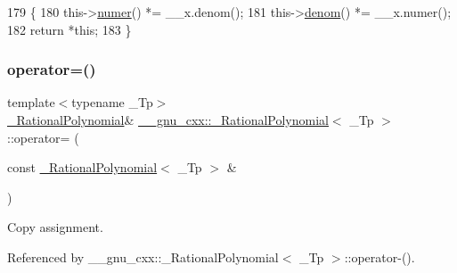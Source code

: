 \begin{DoxyCode}
179       \{
180         this->\hyperlink{class____gnu__cxx_1_1__RationalPolynomial_aa42ac2f6c2368cae05ba3a3cebf0fa24}{numer}() *= \_\_x.denom();
181         this->\hyperlink{class____gnu__cxx_1_1__RationalPolynomial_a05e84913ccfddcf6fcbfe623cb56c937}{denom}() *= \_\_x.numer();
182         \textcolor{keywordflow}{return} *\textcolor{keyword}{this};
183       \}
\end{DoxyCode}
\mbox{\label{class____gnu__cxx_1_1__RationalPolynomial_afa1efd00dfffcf6851bac3da7ba399dc}} 
\subsubsection{\texorpdfstring{operator=()}{operator=()}\hspace{0.1cm}{\footnotesize\ttfamily [1/2]}}
{\footnotesize\ttfamily template$<$typename \+\_\+\+Tp$>$ \\
\hyperlink{class____gnu__cxx_1_1__RationalPolynomial}{\+\_\+\+Rational\+Polynomial}\& \hyperlink{class____gnu__cxx_1_1__RationalPolynomial}{\+\_\+\+\_\+gnu\+\_\+cxx\+::\+\_\+\+Rational\+Polynomial}$<$ \+\_\+\+Tp $>$\+::operator= (\begin{DoxyParamCaption}\item[{const \hyperlink{class____gnu__cxx_1_1__RationalPolynomial}{\+\_\+\+Rational\+Polynomial}$<$ \+\_\+\+Tp $>$ \&}]{ }\end{DoxyParamCaption})\hspace{0.3cm}{\ttfamily [default]}}

Copy assignment. 

Referenced by \+\_\+\+\_\+gnu\+\_\+cxx\+::\+\_\+\+Rational\+Polynomial$<$ \+\_\+\+Tp $>$\+::operator-\/().

\mbox{\label{class____gnu__cxx_1_1__RationalPolynomial_a8013626cc835738ce3dda59d59dfbee8}} 
